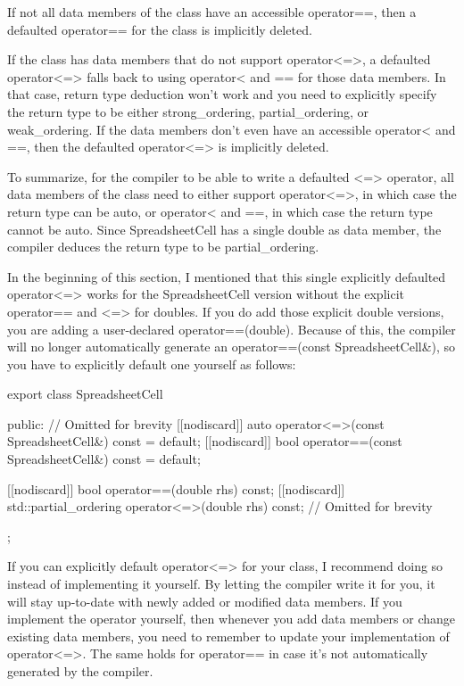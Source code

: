 If not all data members of the class have an accessible operator==, then a defaulted operator== for the class is implicitly deleted.

If the class has data members that do not support operator<=>, a defaulted operator<=> falls back to using operator< and == for those data members. In that case, return type deduction won’t work and you need to explicitly specify the return type to be either strong\_ordering, partial\_ordering, or weak\_ordering. If the data members don’t even have an accessible operator< and ==, then the defaulted operator<=> is implicitly deleted.

To summarize, for the compiler to be able to write a defaulted <=> operator, all data members of the class need to either support operator<=>, in which case the return type can be auto, or operator< and ==, in which case the return type cannot be auto. Since SpreadsheetCell has a single double as data member, the compiler deduces the return type to be partial\_ordering.

In the beginning of this section, I mentioned that this single explicitly defaulted operator<=> works for the SpreadsheetCell version without the explicit operator== and <=> for doubles. If you do add those explicit double versions, you are adding a user-declared operator==(double). Because of this, the compiler will no longer automatically generate an operator==(const SpreadsheetCell\&), so you have to explicitly default one yourself as follows:

\begin{cpp}
export class SpreadsheetCell
{
    public:
        // Omitted for brevity
        [[nodiscard]] auto operator<=>(const SpreadsheetCell&) const = default;
        [[nodiscard]] bool operator==(const SpreadsheetCell&) const = default;

        [[nodiscard]] bool operator==(double rhs) const;
        [[nodiscard]] std::partial_ordering operator<=>(double rhs) const;
        // Omitted for brevity
};
\end{cpp}

If you can explicitly default operator<=> for your class, I recommend doing so instead of implementing it yourself. By letting the compiler write it for you, it will stay up-to-date with newly added or modified data members. If you implement the operator yourself, then whenever you add data members or change existing data members, you need to remember to update your implementation of operator<=>. The same holds for operator== in case it’s not automatically generated by the compiler.

